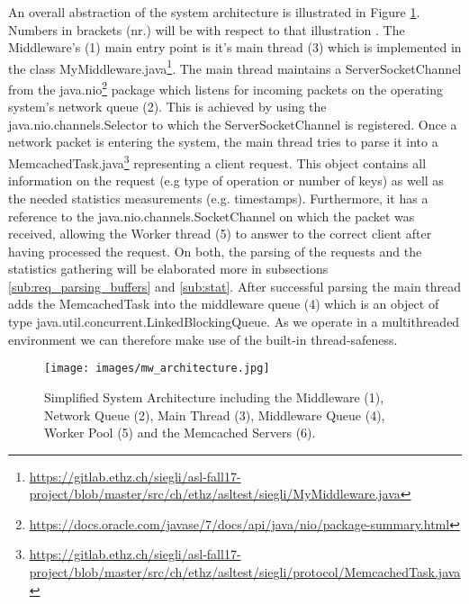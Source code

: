 \documentclass[11pt,a4paper]{article}
\begin{document}
An overall abstraction of the system architecture is illustrated in Figure \ref{fig:system_arch}. Numbers in brackets (nr.) will be with respect to that illustration . The Middleware's (1) main entry point is it's main thread (3) which is implemented in the class MyMiddleware.java\footnote{\url{https://gitlab.ethz.ch/siegli/asl-fall17-project/blob/master/src/ch/ethz/asltest/siegli/MyMiddleware.java}}. The main thread maintains a ServerSocketChannel from the java.nio\footnote{\label{ft:nio}\url{https://docs.oracle.com/javase/7/docs/api/java/nio/package-summary.html}} package which listens for incoming packets on the operating system's network queue (2). This is achieved by using the java.nio.channels.Selector to which the ServerSocketChannel is registered. Once a network packet is entering the system, the main thread tries to parse it into a MemcachedTask.java\footnote{\url{https://gitlab.ethz.ch/siegli/asl-fall17-project/blob/master/src/ch/ethz/asltest/siegli/protocol/MemcachedTask.java}} representing a client request. This object contains all information on the request (e.g type of operation or number of keys) as well as the needed statistics measurements (e.g. timestamps). Furthermore, it has a reference to the java.nio.channels.SocketChannel on which the packet was received, allowing the Worker thread (5) to answer to the correct client after having processed the request. On both, the parsing of the requests and the statistics gathering will be elaborated more in subsections \ref{sub:req_parsing_buffers} and \ref{sub:stat}. After successful parsing the main thread adds the MemcachedTask into the middleware queue (4) which is an object of type java.util.concurrent.LinkedBlockingQueue. As we operate in a multithreaded environment we can therefore make use of the built-in thread-safeness. 


\begin{figure}
    \centering
    \texttt{[image: images/mw\_architecture.jpg]}
    \caption{Simplified System Architecture including the Middleware (1), Network Queue (2), Main Thread (3), Middleware Queue (4), Worker Pool (5) and the Memcached Servers (6).}
    \label{fig:system_arch}
\end{figure} 
\end{document}

